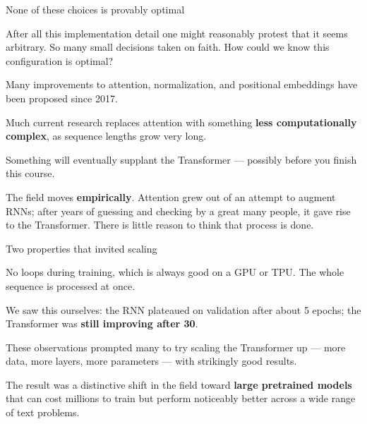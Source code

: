 \documentclass[aspectratio=169,11pt,t]{beamer}
\begin{document}
\begin{frame}[shrink=25]{None of these choices is provably optimal}
{\fontsize{9.4}{12.6}\selectfont\color{fg2}After all this implementation detail one might reasonably protest that it seems arbitrary. So many small decisions taken on faith. How could we know this configuration is optimal?\par}\vskip 4pt
\begin{ibullets}
\item Many improvements to attention, normalization, and positional embeddings have been proposed since 2017.
\item Much current research replaces attention with something \textbf{less computationally complex}, as sequence lengths grow very long.
\item Something will eventually supplant the Transformer --- possibly before you finish this course.
\end{ibullets}
\begin{iband}[signal]
The field moves \textbf{empirically}. Attention grew out of an attempt to augment RNNs; after years of guessing and checking by a great many people, it gave rise to the Transformer. There is little reason to think that process is done.
\end{iband}
\end{frame}


\begin{frame}[shrink=25]{Two properties that invited scaling}
\begin{minipage}[t]{0.494\textwidth}
\begin{icardgood}
No loops during training, which is always good on a GPU or TPU. The whole sequence is processed at once.
\end{icardgood}
\end{minipage}%
\hfill
\begin{minipage}[t]{0.494\textwidth}
\begin{icardaccent}
We saw this ourselves: the RNN plateaued on validation after about 5 epochs; the Transformer was \textbf{still improving after 30}.
\end{icardaccent}
\end{minipage}%
{\fontsize{9.4}{12.6}\selectfont\color{fg2}These observations prompted many to try scaling the Transformer up --- more data, more layers, more parameters --- with strikingly good results.\par}\vskip 4pt
{\fontsize{9.4}{12.6}\selectfont\color{fg2}The result was a distinctive shift in the field toward \textbf{large pretrained models} that can cost millions to train but perform noticeably better across a wide range of text problems.\par}\vskip 4pt
\end{frame}
\end{document}
